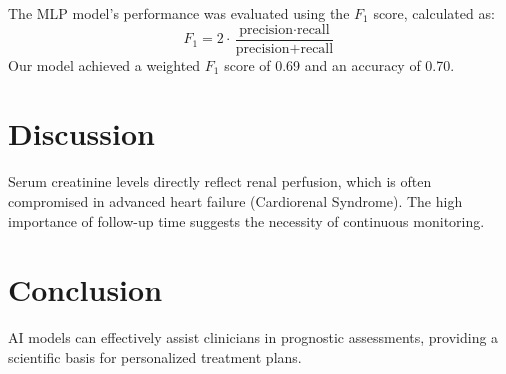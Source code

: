 \documentclass[twocolumn]{article}
\begin{document}
The MLP model's performance was evaluated using the $F_1$ score, calculated as:
\begin{equation}
F_1 = 2 \cdot \frac{\text{precision} \cdot \text{recall}}{\text{precision} + \text{recall}}
\end{equation}
Our model achieved a weighted $F_1$ score of 0.69 and an accuracy of 0.70.

\section{Discussion}
Serum creatinine levels directly reflect renal perfusion, which is often compromised in advanced heart failure (Cardiorenal Syndrome). The high importance of follow-up time suggests the necessity of continuous monitoring.

\section{Conclusion}
AI models can effectively assist clinicians in prognostic assessments, providing a scientific basis for personalized treatment plans.
\end{document}
